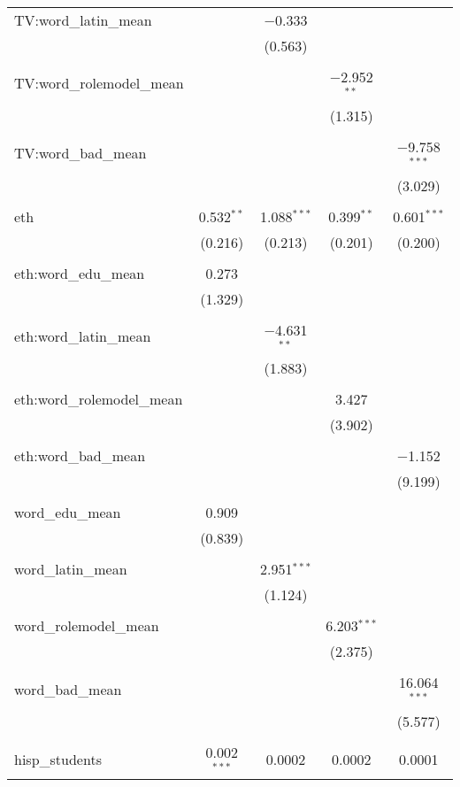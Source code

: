 \begin{table}[!htbp]
\begin{tabular}{@{\extracolsep{-2pt}}lcccc}
 TV:word\_latin\_mean &  & $-$0.333 &  &  \\ 
  &  & (0.563) &  &  \\ 
  & & & & \\ 
 TV:word\_rolemodel\_mean &  &  & $-$2.952$^{**}$ &  \\ 
  &  &  & (1.315) &  \\ 
  & & & & \\ 
 TV:word\_bad\_mean &  &  &  & $-$9.758$^{***}$ \\ 
  &  &  &  & (3.029) \\ 
  & & & & \\ 
 eth & 0.532$^{**}$ & 1.088$^{***}$ & 0.399$^{**}$ & 0.601$^{***}$ \\ 
  & (0.216) & (0.213) & (0.201) & (0.200) \\ 
  & & & & \\ 
 eth:word\_edu\_mean & 0.273 &  &  &  \\ 
  & (1.329) &  &  &  \\ 
  & & & & \\ 
 eth:word\_latin\_mean &  & $-$4.631$^{**}$ &  &  \\ 
  &  & (1.883) &  &  \\ 
  & & & & \\ 
 eth:word\_rolemodel\_mean &  &  & 3.427 &  \\ 
  &  &  & (3.902) &  \\ 
  & & & & \\ 
 eth:word\_bad\_mean &  &  &  & $-$1.152 \\ 
  &  &  &  & (9.199) \\ 
  & & & & \\ 
 word\_edu\_mean & 0.909 &  &  &  \\ 
  & (0.839) &  &  &  \\ 
  & & & & \\ 
 word\_latin\_mean &  & 2.951$^{***}$ &  &  \\ 
  &  & (1.124) &  &  \\ 
  & & & & \\ 
 word\_rolemodel\_mean &  &  & 6.203$^{***}$ &  \\ 
  &  &  & (2.375) &  \\ 
  & & & & \\ 
 word\_bad\_mean &  &  &  & 16.064$^{***}$ \\ 
  &  &  &  & (5.577) \\ 
  & & & & \\ 
 hisp\_students & 0.002$^{***}$ & 0.0002 & 0.0002 & 0.0001 \\ 

\end{tabular}
\end{table}
